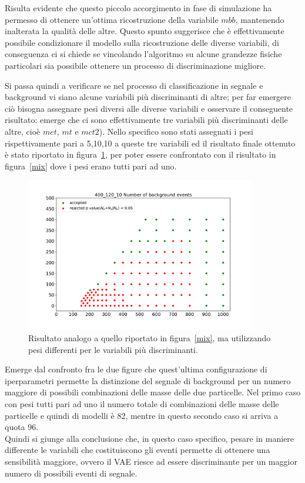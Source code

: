 Risulta evidente che questo piccolo accorgimento in fase di simulazione ha permesso di ottenere un'ottima ricostruzione della variabile $\textit{mbb}$, mantenendo inalterata la qualità delle altre. Questo spunto suggerisce che è effettivamente possibile condizionare il modello sulla ricostruzione delle diverse variabili, di conseguenza ci si chiede se vincolando l'algoritmo su alcune grandezze fisiche particolari sia possibile ottenere un processo di discriminazione migliore.

\newpage

Si passa quindi a verificare se nel processo di classificazione in segnale e background vi siano alcune variabili più discriminanti di altre; per far emergere ciò bisogna assegnare pesi diversi alle diverse variabili e osservare il conseguente risultato: emerge che ci sono effettivamente tre variabili più discriminanti delle altre, cioè $\textit{met}$, $\textit{mt}$ e $\textit{mct2}$). Nello specifico sono stati assegnati i pesi rispettivamente pari a 5,10,10 a queste tre variabili ed il risultato finale ottenuto è stato riportato in figura~\ref{mix_ottimizzato}, per poter essere confrontato con il risultato in figura~\ref{mix} dove i pesi erano tutti pari ad uno.

\begin{figure}[h!]
	\centering
	\includegraphics[width=0.90\textwidth]{figs/risultati_simulazione/mix_ottimizzato.pdf}
	\caption{Risultato analogo a quello riportato in figura~\ref{mix}, ma utilizzando pesi differenti per le variabili più discriminanti.}
	\label{mix_ottimizzato}
\end{figure}

Emerge dal confronto fra le due figure che quest'ultima configurazione di iperparametri permette la distinzione del segnale di background per un numero maggiore di possibili combinazioni delle masse delle due particelle. Nel primo caso con pesi tutti pari ad uno il numero totale di combinazioni delle masse delle particelle e quindi di modelli è 82, mentre in questo secondo caso si arriva a quota 96. \\
Quindi si giunge alla conclusione che, in questo caso specifico, pesare in maniere differente le variabili che costituiscono gli eventi permette di ottenere una sensibilità maggiore, ovvero il VAE riesce ad essere discriminante per un maggior numero di possibili eventi di segnale.

